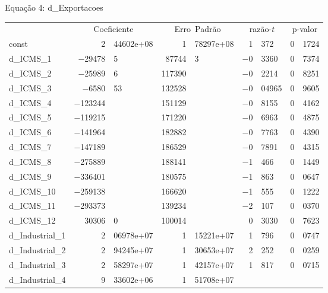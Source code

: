 \documentclass[11pt]{article}
\begin{document}
\begin{center}

Equação 4: d\_Exportacoes\\

\vspace{1em}

\begin{tabular}{lr@{,}lr@{,}lr@{,}lr@{,}l}
  &
 \multicolumn{2}{c}{Coeficiente} &
  \multicolumn{2}{c}{Erro\ Padrão} &
   \multicolumn{2}{c}{razão-$t$} &
    \multicolumn{2}{c}{p-valor} \\[1ex]
const &
  2&44602\textrm{e+08} &
    1&78297\textrm{e+08} &
      1&372 &
        0&1724 \\
d\_ICMS\_1 &
  $-$29478&5 &
    87744&3 &
      $-$0&3360 &
        0&7374 \\
d\_ICMS\_2 &
  $-$25989&6 &
    117390& &
      $-$0&2214 &
        0&8251 \\
d\_ICMS\_3 &
  $-$6580&53 &
    132528& &
      $-$0&04965 &
        0&9605 \\
d\_ICMS\_4 &
  $-$123244& &
    151129& &
      $-$0&8155 &
        0&4162 \\
d\_ICMS\_5 &
  $-$119215& &
    171220& &
      $-$0&6963 &
        0&4875 \\
d\_ICMS\_6 &
  $-$141964& &
    182882& &
      $-$0&7763 &
        0&4390 \\
d\_ICMS\_7 &
  $-$147189& &
    186529& &
      $-$0&7891 &
        0&4315 \\
d\_ICMS\_8 &
  $-$275889& &
    188141& &
      $-$1&466 &
        0&1449 \\
d\_ICMS\_9 &
  $-$336401& &
    180575& &
      $-$1&863 &
        0&0647 \\
d\_ICMS\_10 &
  $-$259138& &
    166620& &
      $-$1&555 &
        0&1222 \\
d\_ICMS\_11 &
  $-$293373& &
    139234& &
      $-$2&107 &
        0&0370 \\
d\_ICMS\_12 &
  30306&0 &
    100014& &
      0&3030 &
        0&7623 \\
d\_Industrial\_1 &
  2&06978\textrm{e+07} &
    1&15221\textrm{e+07} &
      1&796 &
        0&0747 \\
d\_Industrial\_2 &
  2&94245\textrm{e+07} &
    1&30653\textrm{e+07} &
      2&252 &
        0&0259 \\
d\_Industrial\_3 &
  2&58297\textrm{e+07} &
    1&42157\textrm{e+07} &
      1&817 &
        0&0715 \\
d\_Industrial\_4 &
  9&33602\textrm{e+06} &
    1&51708\textrm{e+07} &

\end{tabular}
\end{center}
\end{document}
